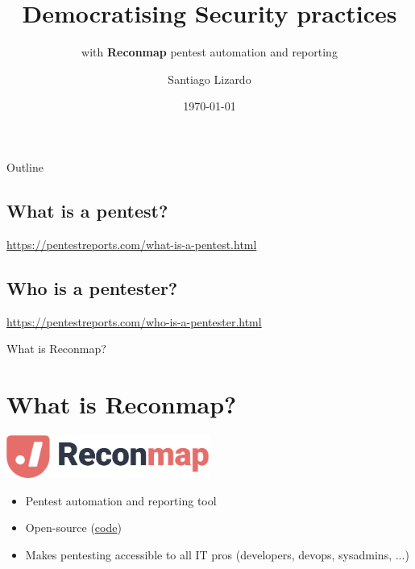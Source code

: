 \documentclass{beamer}
\title{Democratising Security practices}
\subtitle{with \textbf{Reconmap} pentest automation and reporting}
\author{Santiago Lizardo}
\date{\today}
\begin{document}
\begin{frame}
\titlepage    
\end{frame}

\begin{frame}{Outline}
    \tableofcontents
\end{frame}

\begin{frame}{\section{What is a pentest?}}
    \href{https://pentestreports.com/what-is-a-pentest.html}{https://pentestreports.com/what-is-a-pentest.html}
\end{frame}

\begin{frame}{\section{Who is a pentester?}}
    \href{https://pentestreports.com/who-is-a-pentester.html}{https://pentestreports.com/who-is-a-pentester.html}
\end{frame}

\begin{frame}{What is Reconmap?}
    \section{What is Reconmap?}
    \includegraphics[width=0.5\textwidth]{reconmap-logo.png}
    \begin{itemize}
        \item Pentest automation and reporting tool
        \item Open-source (\href{https://github.com/reconmap}{code})
        \item Makes pentesting accessible to all IT pros (developers, devops, sysadmins, ...)
    \end{itemize}
\end{frame}
\end{document}
